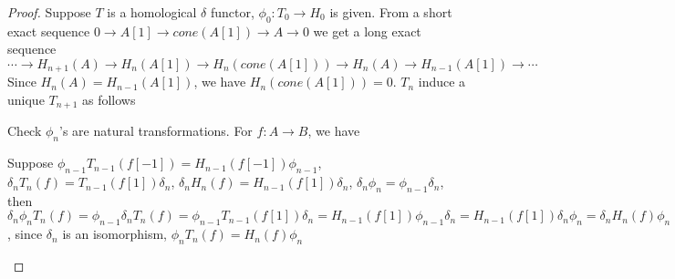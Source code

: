 \documentclass{article}
\theoremstyle{definition}
\theoremstyle{remark}
\theoremstyle{definition}
\begin{document}
\begin{proof}
Suppose $T$ is a homological $\delta$ functor, $\phi_0:T_0\to H_0$ is given. From a short exact sequence $0\to A[1]\to cone(A[1])\to A\to 0$ we get a long exact sequence
\[\cdots\to H_{n+1}(A)\to H_n(A[1])\to H_n(cone(A[1]))\to H_n(A)\to H_{n-1}(A[1])\to\cdots\]
Since $H_n(A)=H_{n-1}(A[1])$, we have $H_n(cone(A[1]))=0$. $T_n$ induce a unique $T_{n+1}$ as follows
\begin{center}
\end{center}
Check $\phi_n$'s are natural transformations. For $f:A\to B$, we have
\begin{center}
\end{center}
Suppose $\phi_{n-1}T_{n-1}(f[-1])=H_{n-1}(f[-1])\phi_{n-1}$, $\delta_nT_n(f)=T_{n-1}(f[1])\delta_n$, $\delta_nH_n(f)=H_{n-1}(f[1])\delta_n$, $\delta_n\phi_n=\phi_{n-1}\delta_n$, then $\delta_n\phi_nT_n(f)=\phi_{n-1}\delta_nT_n(f)=\phi_{n-1}T_{n-1}(f[1])\delta_n=H_{n-1}(f[1])\phi_{n-1}\delta_n=H_{n-1}(f[1])\delta_n\phi_n=\delta_nH_n(f)\phi_n$, since $\delta_n$ is an isomorphism, $\phi_nT_n(f)=H_n(f)\phi_n$
\begin{center}
\end{center}
\end{proof}
\end{document}
